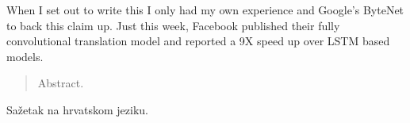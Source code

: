 \documentclass[times, utf8, diplomski, numeric, english]{fer}
\begin{document}
When I set out to write this I only had my own experience and Google’s ByteNet to back this claim up. Just this week, Facebook published their fully convolutional translation model and reported a 9X speed up over LSTM based models.





\begin{abstract}
Abstract.

\end{abstract}

\begin{sazetak}
Sažetak na hrvatskom jeziku.

\end{sazetak}
\end{document}
